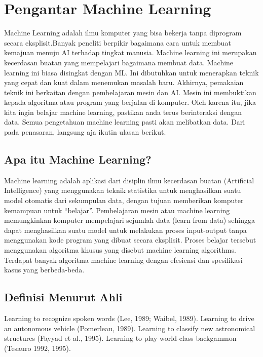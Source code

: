 \section{Pengantar Machine Learning}
Machine Learning adalah ilmu komputer yang bisa bekerja tanpa diprogram secara eksplisit.Banyak peneliti berpikir bagaimana cara untuk membuat kemajuan menuju AI terhadap tingkat manusia. Machine learning ini merupakan kecerdasan buatan yang mempelajari bagaimana membuat data. Machine learning ini biasa disingkat dengan ML. Ini dibutuhkan untuk menerapkan teknik yang cepat dan kuat dalam menemukan masalah baru.
Akhirnya, pemakaian teknik ini berkaitan dengan pembelajaran mesin dan AI. Mesin ini membuktikan kepada algoritma atau program yang berjalan di komputer. Oleh karena itu, jika kita ingin belajar machine learning, pastikan anda terus berinteraksi dengan data. Semua pengetahuan machine learning pasti akan melibatkan data. Dari pada penasaran, langsung aja ikutin ulasan berikut.
\subsection{Apa itu Machine Learning?}
Machine learning adalah aplikasi dari disiplin ilmu kecerdasan buatan (Artificial Intelligence) yang menggunakan teknik statistika untuk menghasilkan suatu model otomatis dari sekumpulan data, dengan tujuan memberikan komputer kemampuan untuk “belajar”. Pembelajaran mesin atau machine learning memungkinkan komputer mempelajari sejumlah data (learn from data) sehingga dapat menghasilkan suatu model untuk melakukan proses input-output tanpa menggunakan kode program yang dibuat secara eksplisit. Proses belajar tersebut menggunakan algoritma khusus yang disebut machine learning algorithms. Terdapat banyak algoritma machine learning dengan efesiensi dan spesifikasi kasus yang berbeda-beda.
\subsection{Definisi Menurut Ahli}
Learning to recognize spoken words (Lee, 1989; Waibel, 1989).
Learning to drive an autonomous vehicle (Pomerleau, 1989).
Learning to classify new astronomical structures (Fayyad et al., 1995).
Learning to play world-class backgammon (Tesauro 1992, 1995).

